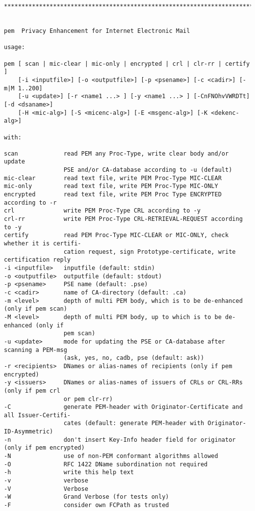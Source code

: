 {\begin{verbatim}
****************************************************************************************


pem  Privacy Enhancement for Internet Electronic Mail

usage:

pem [ scan | mic-clear | mic-only | encrypted | crl | clr-rr | certify ]
    [-i <inputfile>] [-o <outputfile>] [-p <psename>] [-c <cadir>] [-m|M 1..200]
    [-u <update>] [-r <name1 ...> ] [-y <name1 ...> ] [-CnFNOhvVWRDTt] [-d <dsaname>]
    [-H <mic-alg>] [-S <micenc-alg>] [-E <msgenc-alg>] [-K <dekenc-alg>]

with:

scan             read PEM any Proc-Type, write clear body and/or update
                 PSE and/or CA-database according to -u (default)
mic-clear        read text file, write PEM Proc-Type MIC-CLEAR
mic-only         read text file, write PEM Proc-Type MIC-ONLY
encrypted        read text file, write PEM Proc Type ENCRYPTED according to -r
crl              write PEM Proc-Type CRL according to -y
crl-rr           write PEM Proc-Type CRL-RETRIEVAL-REQUEST according to -y
certify          read PEM Proc-Type MIC-CLEAR or MIC-ONLY, check whether it is certifi-
                 cation request, sign Prototype-certificate, write certification reply
-i <inputfile>   inputfile (default: stdin)
-o <outputfile>  outputfile (default: stdout)
-p <psename>     PSE name (default: .pse)
-c <cadir>       name of CA-directory (default: .ca)
-m <level>       depth of multi PEM body, which is to be de-enhanced (only if pem scan)
-M <level>       depth of multi PEM body, up to which is to be de-enhanced (only if 
                 pem scan)
-u <update>      mode for updating the PSE or CA-database after scanning a PEM-msg
                 (ask, yes, no, cadb, pse (default: ask))
-r <recipients>  DNames or alias-names of recipients (only if pem encrypted)
-y <issuers>     DNames or alias-names of issuers of CRLs or CRL-RRs (only if pem crl 
                 or pem clr-rr)
-C               generate PEM-header with Originator-Certificate and all Issuer-Certifi-
                 cates (default: generate PEM-header with Originator-ID-Asymmetric)
-n               don't insert Key-Info header field for originator (only if pem encrypted)
-N               use of non-PEM conformant algorithms allowed
-O               RFC 1422 DName subordination not required
-h               write this help text
-v               verbose
-V               Verbose
-W               Grand Verbose (for tests only)
-F               consider own FCPath as trusted

\end{verbatim}}

